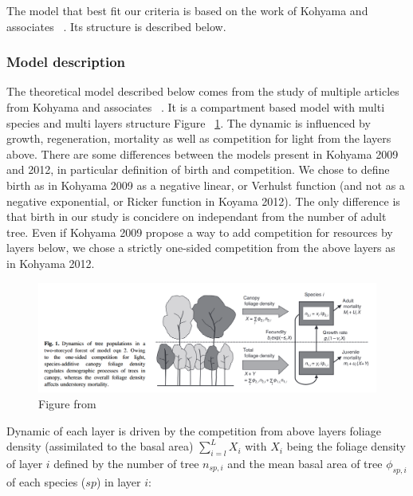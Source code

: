 \documentclass{article}
\begin{document}
The model that best fit our criteria is based on the work of Kohyama and associates ~\autocite{kohyamaStratificationTheoryPlant2009, kohyamaOnesidedCompetitionLight2012}. Its structure is described below.

\subsubsection{Model description}

The theoretical model described below comes from the study of multiple articles from Kohyama and associates ~\autocite{kohyamaStratificationTheoryPlant2009, kohyamaOnesidedCompetitionLight2012}.
It is a compartment based model with multi species and multi layers structure Figure ~\ref{fig:fig_model}. The dynamic is influenced by growth, regeneration, mortality as well as competition for light from the layers above. There are some differences between the models present in Kohyama 2009 and 2012, in particular definition of birth and competition. We chose to define birth as in Kohyama 2009 as a negative linear, or Verhulst function (and not as a negative exponential, or Ricker function in Koyama 2012). The only difference is that birth in our study is concidere on independant from the number of adult tree. Even if Kohyama 2009 propose a way to add competition for resources by layers below, we chose a strictly one-sided competition from the above layers as in Kohyama 2012.

\begin{figure}[h]
    \centering
    \includegraphics[width=\textwidth]{Figure/Fig_model_Kohyama.png}
    \caption{Figure from ~\autocite{kohyamaOnesidedCompetitionLight2012}}
    \label{fig:fig_model}
\end{figure}

Dynamic of each layer is driven by the competition from above layers foliage density (assimilated to the basal area) $\sum_{i = l}^{L} X_i$ with $X_i$ being the foliage density of layer $i$ defined by the number of tree $n_{sp,i}$ and the mean basal area of tree $\phi_{sp,i}$ of each species ($sp$) in layer $i$:
\end{document}
